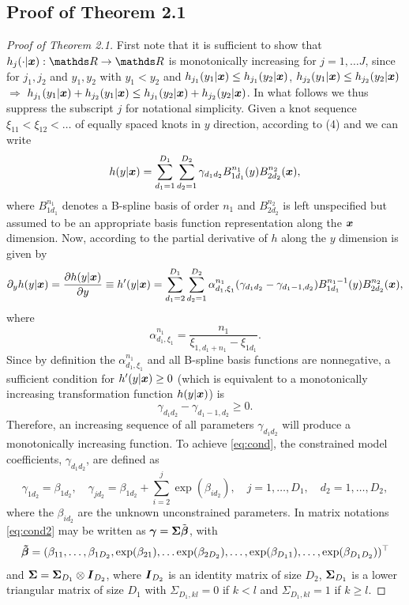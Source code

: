 \documentclass[12pt, a4paper]{article}
\begin{document}
\subsection{Proof of Theorem 2.1}
\begin{proof}[Proof of Theorem 2.1]
First note that it is sufficient to show that $h_j(\cdot|\xvec):\dsR\to\dsR$ is monotonically increasing for $j=1,\ldots J$, since for  $j_1,j_2$ and $y_1,y_2$ with $y_1<y_2$ and $h_{j_1}(y_1|\text{\boldmath$x$})\leq h_{j_1}(y_2|\text{\boldmath$x$})$, $h_{j_2}(y_1|\text{\boldmath$x$})\leq h_{j_2}(y_2|\text{\boldmath$x$})$ $\Rightarrow$ $h_{j_1}(y_1|\text{\boldmath$x$})+h_{j_2}(y_1|\text{\boldmath$x$})\leq h_{j_1}(y_2|\text{\boldmath$x$})+h_{j_2}(y_2|\text{\boldmath$x$})$. In what follows we thus suppress the subscript $j$ for notational simplicity. Given a knot sequence $\xi_{11}<\xi_{12}<\ldots$ of equally spaced knots in $y$  direction, according to (4) and \citet{HoeHoe2013} we can write
\[
h(y|\text{\boldmath$x$})=\sum_{d_1=1}^{D_1} \sum_{d_2=1}^{D_2} \gamma_{d_1d_2} B^{n_1}_{1d_1}(y)B^{n_2}_{2d_2}(\text{\boldmath$x$}),
\]
where $B^{n_1}_{1d_1}$ denotes a B-spline basis of order $n_1$ and $B^{n_2}_{2d_2}$ is left unspecified but assumed to be an appropriate basis function representation along the $\text{\boldmath$x$}$ dimension. Now, according to \citet{HoeHoe2013} the partial derivative of $h$ along the $y$ dimension is given by
\[
\partial_y h(y|\text{\boldmath$x$})=\frac{\partial h(y|\text{\boldmath$x$})}{\partial y}\equiv h^\prime(y|\text{\boldmath$x$})=\sum_{d_1=2}^{D_1} \sum_{d_2=1}^{D_2} \alpha^{n_1}_{d_1,\xi_1}(\gamma_{d_1d_2}-\gamma_{d_1-1, d_2})B^{n_1-1}_{1d_1}(y)B^{n_2}_{2d_2}(\text{\boldmath$x$}),
\]
where
\[
\alpha^{n_1}_{d_1,\xi_1}=\frac{n_1}{\xi_{1,d_1+n_1}-\xi_{1d_1}}.
\]
Since by definition the $\alpha^{n_1}_{d_1,\xi_1}$ and  all B-spline basis functions are nonnegative, a sufficient
condition for $h^\prime(y|\text{\boldmath$x$})\geq 0$ (which is equivalent to a monotonically increasing transformation function $h(y|\text{\boldmath$x$})$) is 
\begin{equation}\label{eq:cond}
\gamma_{d_1d_2}-\gamma_{d_1-1, d_2}\geq 0.
\end{equation}
Therefore, an increasing sequence of all  parameters $\gamma_{d_1d_2}$ will produce
a monotonically increasing function. To achieve \eqref{eq:cond}, the constrained model coefficients, $\gamma_{d_1d_2}$, are
defined as
\begin{equation}\label{eq:cond2}
\gamma_{1d_2}=\beta_{1d_2}, \quad \gamma_{jd_2}=\beta_{1d_2}+\sum_{i=2}^j\exp(\beta_{id_2}),\quad j=1,\ldots,D_1,\quad d_2=1,\ldots,D_2,
\end{equation}
where the $\beta_{id_2}$ are the unknown unconstrained parameters. In matrix notations \eqref{eq:cond2} may be written
as $\text{\boldmath$\gamma$}=\mathbf{\Sigma}\tilde{\text{\boldmath$\beta$}}$, with
\begin{align*}
\text{\boldmath$\tilde \beta$} = (\beta_{11}, \ldots, \beta_{1D_2}, \exp(\beta_{21}), \ldots \exp(\beta_{2D_2}), \ldots ,\exp(\beta_{D_1 1}),\ldots, \exp(\beta_{D_1 D_2}))^\top
\end{align*}
and  $\mathbf{\Sigma}= \mathbf{\Sigma}_{D_1} \otimes \text{\boldmath$I$}_{D_2}$, where $\text{\boldmath$I$}_{D_2}$ is an identity matrix of size $D_2$, $\mathbf{\Sigma}_{D_1}$ is a lower triangular matrix of size $D_1$ with $\Sigma_{D_1,kl}=0$ if $k < l$ and $\Sigma_{D_1,kl} = 1$ if $k \geq l$.
\end{proof}
\newpage
\end{document}
